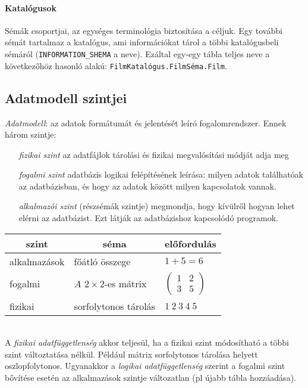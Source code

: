 \documentclass[fleqn,10pt,a4paper]{article}
\theoremstyle{magyar}
\begin{document}
  \paragraph{Katalógusok} Sémák csoportjai, az egységes terminológia biztosítása a céljuk. Egy további sémát tartalmaz a
  katalógus, ami információkat tárol a többi katalógusbeli sémáról (\texttt{INFORMATION\_SHEMA} a neve). Ezáltal egy-egy
  tábla teljes neve a következőhöz hasonló alakú: \texttt{FilmKatalógus.FilmSéma.Film}.
  
  
  \subsection{Adatmodell szintjei}
  \emph{Adatmodell}: az adatok formátumát és jelentését leíró fogalomrendszer. Ennek három szintje:
  \begin{itemize}
  \item[\emph{fizikai szint}] az adatfájlok tárolási és fizikai megvalósítási módját adja meg
  \item[\emph{fogalmi szint}] adatbázis logikai felépítésének leírása: milyen adatok találhatóak az adatbázisban, és
    hogy az adatok között milyen kapcsolatok vannak.
  \item[\emph{alkalmazói szint}] (részsémák szintje) megmondja, hogy kívülről hogyan lehet elérni az adatbázist. Ezt
    látják az adatbázishoz kapcsolódó programok.
  \end{itemize}


  \begin{tabular}{@{}lll@{}} \toprule
    \multicolumn{1}{c}{szint} & \multicolumn{1}{c}{séma} & \multicolumn{1}{c}{előfordulás}\\
    \midrule
    alkalmazások & főátló összege & $1+5=6$\\
    fogalmi & $A$ $2\times 2$-es mátrix & $\begin{pmatrix}1 & 2\\ 3 & 5\end{pmatrix}$\\
      fizikai & sorfolytonos tárolás & $1\ 2\ 3\ 4\ 5$\\
      \bottomrule
  \end{tabular}\\
  
  A \emph{fizikai adatfüggetlenség} akkor teljesül, ha a fizikai szint módosítható a többi szint változtatása
  nélkül. Például mátrix sorfolytonos tárolása helyett oszlopfolytonos.
  Ugyanakkor a \emph{logikai adatfüggetlenség} szerint a fogalmi szint bővítése esetén az alkalmazások szintje
  változatlan (pl újabb tábla hozzáadása).
  
\end{document}
